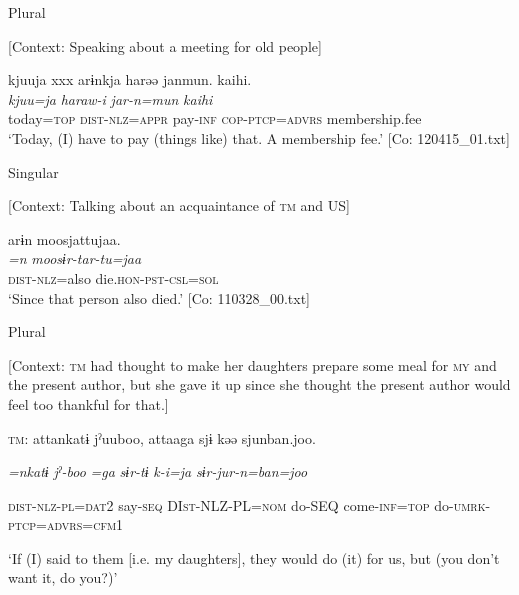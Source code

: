  \ex \label{ex:5:b} Plural

    [Context: Speaking about a meeting for old people]

\glll  kjuuja  xxx  arɨnkja  harəə  janmun.   {\textbar}kaihi{\textbar}.\\
\textit{kjuu=ja}  {}  \textit{}  \textit{haraw-i}  \textit{jar-n=mun}   \textit{kaihi}\\
today=\textsc{top}  {}  \textsc{dist}-\textsc{nlz}=\textsc{appr}  pay-\textsc{inf}  \textsc{cop}-\textsc{ptcp}=\textsc{advrs}   membership.fee\\
\glt ‘Today, (I) have to pay (things like) that. A membership fee.’ [Co: 120415\_01.txt]


 \ex \label{ex:5:c} Singular

    [Context: Talking about an acquaintance of \textsc{tm} and US]

\glll  arɨn  moosjattujaa.\\
\textit{=n}  \textit{moosɨr-tar-tu=jaa}\\
\textsc{dist}-\textsc{nlz}=also  die.\textsc{hon}-\textsc{pst}-\textsc{csl}=\textsc{sol}\\
\glt ‘Since that person also died.’ [Co: 110328\_00.txt]

  \ex \label{ex:5:d}  Plural

    [Context: \textsc{tm} had thought to make her daughters prepare some meal for \textsc{my} and the present author, but she gave it up since she thought the present author would feel too thankful for that.]

    \textsc{tm}:  attankatɨ  jˀuuboo,  attaaga  sjɨ   kəə  sjunban.joo.
                                                                                     
    \textit{=nkatɨ}  \textit{jˀ-boo}  \textit{=ga}  \textit{sɨr-tɨ}  \textit{k-i=ja}  \textit{sɨr-jur-n=ban=joo}
                                                                                     
    \textsc{dist}-\textsc{nlz}-\textsc{pl}=\textsc{dat}2  say-\textsc{seq}  DI\textsc{st}-NLZ-PL=\textsc{nom}  do-SEQ  come-\textsc{inf}=\textsc{top}  do-\textsc{umrk}-\textsc{ptcp}=\textsc{advrs}=\textsc{cfm}1

    ‘If (I) said to them [i.e. my daughters], they would do (it) for us, but (you don’t want it, do you?)’

